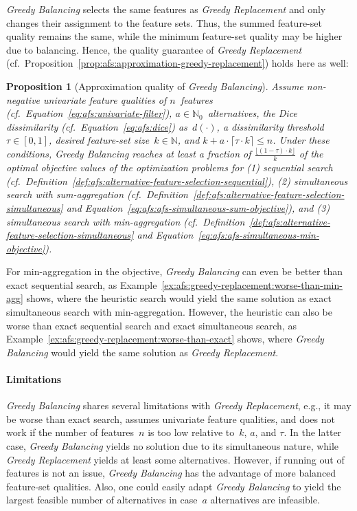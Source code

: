 \documentclass{article}
\newtheorem{proposition}{Proposition}
\theoremstyle{definition}
\begin{document}
\emph{Greedy Balancing} selects the same features as \emph{Greedy Replacement} and only changes their assignment to the feature sets.
Thus, the summed feature-set quality remains the same, while the minimum feature-set quality may be higher due to balancing.
Hence, the quality guarantee of \emph{Greedy Replacement} (cf.~Proposition~\ref{prop:afs:approximation-greedy-replacement}) holds here as well:
%
\begin{proposition}[Approximation quality of \emph{Greedy Balancing}]
	Assume non-negative univariate feature qualities of $n$~features (cf.~Equation~\ref{eq:afs:univariate-filter}), $a \in \mathbb{N}_0$~alternatives, the Dice dissimilarity (cf.~Equation~\ref{eq:afs:dice}) as~$d(\cdot)$, a dissimilarity threshold~$\tau \in [0,1]$, desired feature-set size~$k \in \mathbb{N}$, and $k + a \cdot \lceil \tau \cdot k \rceil \leq n$.
	Under these conditions, \emph{Greedy Balancing} reaches at least a fraction of $\frac{\lfloor (1 - \tau) \cdot k \rfloor}{k}$ of the optimal objective values of the optimization problems for (1) sequential search (cf.~Definition~\ref{def:afs:alternative-feature-selection-sequential}), (2) simultaneous search with sum-aggregation (cf.~Definition~\ref{def:afs:alternative-feature-selection-simultaneous} and Equation~\ref{eq:afs:afs-simultaneous-sum-objective}), and (3) simultaneous search with min-aggregation (cf.~Definition~\ref{def:afs:alternative-feature-selection-simultaneous} and Equation~\ref{eq:afs:afs-simultaneous-min-objective}).
	\label{prop:afs:approximation-greedy-balancing}
\end{proposition}
%
For min-aggregation in the objective, \emph{Greedy Balancing} can even be better than exact sequential search, as Example~\ref{ex:afs:greedy-replacement:worse-than-min-agg} shows, where the heuristic search would yield the same solution as exact simultaneous search with min-aggregation.
However, the heuristic can also be worse than exact sequential search and exact simultaneous search, as Example~\ref{ex:afs:greedy-replacement:worse-than-exact} shows, where \emph{Greedy Balancing} would yield the same solution as \emph{Greedy Replacement}.

\paragraph{Limitations}

\emph{Greedy Balancing} shares several limitations with \emph{Greedy Replacement}, e.g., it may be worse than exact search, assumes univariate feature qualities, and does not work if the number of features~$n$ is too low relative to~$k$, $a$, and $\tau$.
In the latter case, \emph{Greedy Balancing} yields no solution due to its simultaneous nature, while \emph{Greedy Replacement} yields at least some alternatives.
However, if running out of features is not an issue, \emph{Greedy Balancing} has the advantage of more balanced feature-set qualities.
Also, one could easily adapt \emph{Greedy Balancing} to yield the largest feasible number of alternatives in case~$a$ alternatives are infeasible.
\end{document}
